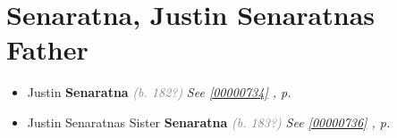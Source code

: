 \documentclass[10pt, openany]{book}
\begin{document}
\chapter{Senaratna, Justin Senaratnas Father}
\label{00000735}
\textcolor{slmaroon}{\textit{}}
\begin{itemize}
\item{Justin \textbf{Senaratna} \textcolor{gray}{\textit{(b. 182?)}} \textcolor{slteal}{\textit{See  \autoref{00000734} \textit{, p. \pageref{00000734} }}}}
\item{Justin Senaratnas Sister \textbf{Senaratna} \textcolor{gray}{\textit{(b. 183?)}} \textcolor{slteal}{\textit{See  \autoref{00000736} \textit{, p. \pageref{00000736} }}}}
\end{itemize}
   
\end{document}
